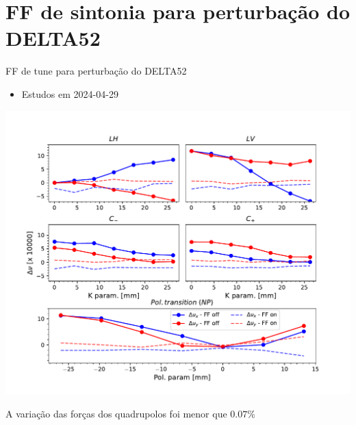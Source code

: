 \documentclass[aspectratio=169]{beamer}            %
\newcommand\Wider[2][3em]{%
\makebox[\linewidth][c]{%
  \begin{minipage}{\dimexpr\textwidth+#1\relax}
  \raggedright#2
  \end{minipage}%
  }%
}
\begin{document}



\section{FF de sintonia para perturbação do DELTA52}

\begin{frame}{FF de tune para perturbação do DELTA52}

\begin{itemize}
    \item Estudos em 2024-04-29
\end{itemize}

\centering
\includegraphics[scale=0.4]{2024-05-10/figures/Tune_deviation.pdf}

A variação das forças dos quadrupolos foi menor que $0.07 \%$
\end{frame}



\end{document}
